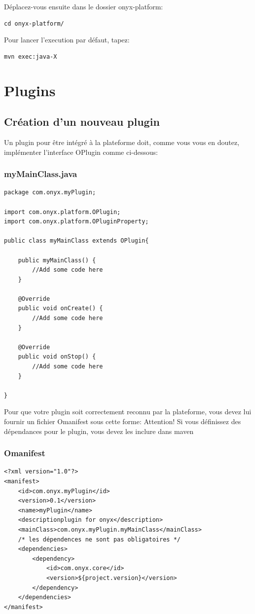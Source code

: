 Déplacez-vous ensuite dans le dossier onyx-platform:
\begin{verbatim}
cd onyx-platform/
\end{verbatim}

Pour lancer l'execution par défaut, tapez:
\begin{verbatim}
mvn exec:java-X
\end{verbatim}

\newpage
\section{Plugins}

\subsection{Création d'un nouveau plugin}

Un plugin pour être intégré à la plateforme doit, comme vous vous en doutez, implémenter l'interface OPlugin comme ci-dessous:
\subsubsection{myMainClass.java}
\begin{verbatim}
package com.onyx.myPlugin;

import com.onyx.platform.OPlugin;
import com.onyx.platform.OPluginProperty;

public class myMainClass extends OPlugin{

    public myMainClass() {
        //Add some code here
    }

    @Override
    public void onCreate() {
        //Add some code here
    }

    @Override
    public void onStop() {
        //Add some code here
    }

}
\end{verbatim}

Pour que votre plugin soit correctement reconnu par la plateforme, vous devez lui fournir un fichier Omanifest sous cette forme:
Attention! Si vous définissez des dépendances pour le plugin, vous devez les inclure dans maven
\subsubsection{Omanifest}
\begin{verbatim}
<?xml version="1.0"?>
<manifest>
    <id>com.onyx.myPlugin</id>
    <version>0.1</version>
    <name>myPlugin</name>
    <descriptionplugin for onyx</description>
    <mainClass>com.onyx.myPlugin.myMainClass</mainClass>
    /* les dépendences ne sont pas obligatoires */
    <dependencies>
        <dependency>
            <id>com.onyx.core</id>
            <version>${project.version}</version>
        </dependency>
    </dependencies>
</manifest>
\end{verbatim}

